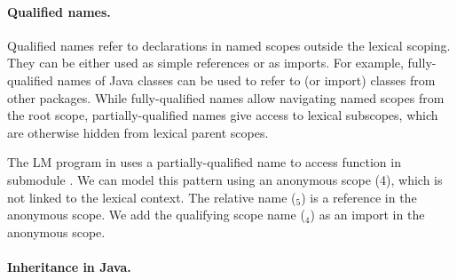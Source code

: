 \paragraph{Qualified names.}

Qualified names refer to declarations in named scopes outside the lexical scoping.
They can be either used as simple references or as imports.
For example, fully-qualified names of Java classes can be used to refer to (or import) classes
  from other packages.
While fully-qualified names allow navigating named scopes from the root scope,
partially-qualified names give access to lexical subscopes, 
  which are otherwise hidden from lexical parent scopes.

The LM program in  uses a
partially-qualified name  to access function  in submodule .
We can model this pattern using an anonymous scope (4),
which is not linked to the lexical context. The relative name
($_5$) is a reference in the anonymous scope.
We add the qualifying scope name ($_4$) as an import in the
anonymous scope. 
  



\paragraph{Inheritance in Java.}

